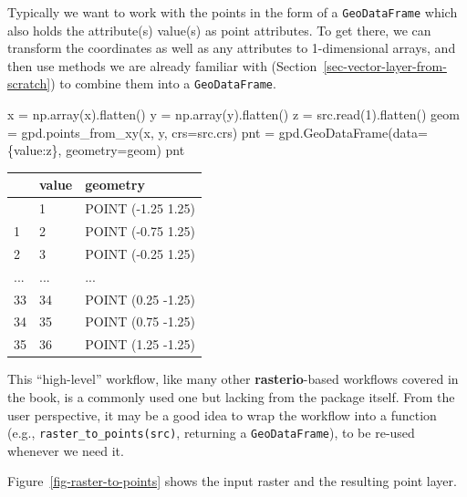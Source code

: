 \documentclass[
  letterpaper,
]{krantz}
\newenvironment{Shaded}{\begin{snugshade}}{\end{snugshade}}
\newcommand{\DecValTok}[1]{\textcolor[rgb]{0.68,0.00,0.00}{#1}}
\newcommand{\NormalTok}[1]{\textcolor[rgb]{0.00,0.23,0.31}{#1}}
\newcommand{\OperatorTok}[1]{\textcolor[rgb]{0.37,0.37,0.37}{#1}}
\newcommand{\StringTok}[1]{\textcolor[rgb]{0.13,0.47,0.30}{#1}}
\begin{document}
Typically we want to work with the points in the form of a
\texttt{GeoDataFrame} which also holds the attribute(s) value(s) as
point attributes. To get there, we can transform the coordinates as well
as any attributes to 1-dimensional arrays, and then use methods we are
already familiar with (Section~\ref{sec-vector-layer-from-scratch}) to
combine them into a \texttt{GeoDataFrame}.

\begin{Shaded}
\begin{Highlighting}[]
\NormalTok{x }\OperatorTok{=}\NormalTok{ np.array(x).flatten()}
\NormalTok{y }\OperatorTok{=}\NormalTok{ np.array(y).flatten()}
\NormalTok{z }\OperatorTok{=}\NormalTok{ src.read(}\DecValTok{1}\NormalTok{).flatten()}
\NormalTok{geom }\OperatorTok{=}\NormalTok{ gpd.points\_from\_xy(x, y, crs}\OperatorTok{=}\NormalTok{src.crs)}
\NormalTok{pnt }\OperatorTok{=}\NormalTok{ gpd.GeoDataFrame(data}\OperatorTok{=}\NormalTok{\{}\StringTok{\textquotesingle{}value\textquotesingle{}}\NormalTok{:z\}, geometry}\OperatorTok{=}\NormalTok{geom)}
\NormalTok{pnt}
\end{Highlighting}
\end{Shaded}

\begin{longtable}[]{@{}lll@{}}
\toprule\noalign{}
& value & geometry \\
\midrule\noalign{}
\endhead
\bottomrule\noalign{}
\endlastfoot
0 & 1 & POINT (-1.25 1.25) \\
1 & 2 & POINT (-0.75 1.25) \\
2 & 3 & POINT (-0.25 1.25) \\
... & ... & ... \\
33 & 34 & POINT (0.25 -1.25) \\
34 & 35 & POINT (0.75 -1.25) \\
35 & 36 & POINT (1.25 -1.25) \\
\end{longtable}

This ``high-level'' workflow, like many other \textbf{rasterio}-based
workflows covered in the book, is a commonly used one but lacking from
the package itself. From the user perspective, it may be a good idea to
wrap the workflow into a function (e.g.,
\texttt{raster\_to\_points(src)}, returning a \texttt{GeoDataFrame}), to
be re-used whenever we need it.

Figure~\ref{fig-raster-to-points} shows the input raster and the
resulting point layer.
\end{document}
